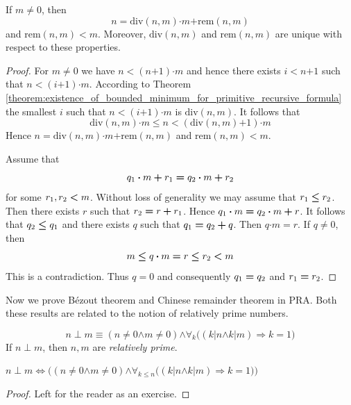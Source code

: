 \documentclass[10pt]{amsart}
\newcommand{\mforall}{\boldsymbol{\forall}}
\newcommand{\mra}{\boldsymbol{\Rightarrow}}
\newcommand{\mequiv}{\boldsymbol{\Leftrightarrow}}
\newcommand{\mand}{\boldsymbol{\wedge}}
\newcommand{\mle}{\boldsymbol{<}}
\newcommand{\mleq}{\boldsymbol{\leq}}
\newcommand{\meq}{\boldsymbol{=}}
\newcommand{\mneq}{\boldsymbol{\neq}}
\newcommand{\mplus}{\boldsymbol{+}}
\newcommand{\mdot}{\boldsymbol{\cdot}}
\begin{document}
\begin{theorem}\label{theorem:euclidean_division_theorem}
	If $m \mneq 0$, then
	$$n \meq \mathrm{div}(n,m)\mdot m \mplus \mathrm{rem}(n,m)$$
	and $\mathrm{rem}(n,m) \mle m$. Moreover, $\mathrm{div}(n,m)$ and $\mathrm{rem}(n,m)$ are unique with respect to these properties.
\end{theorem}
\begin{proof}
	For $m \mneq 0$ we have $n \mle (n \mplus 1) \mdot m$ and hence there exists $i \mle n \mplus 1$ such that $n \mle (i \mplus 1)\mdot m$. According to Theorem \ref{theorem:existence_of_bounded_minimum_for_primitive_recursive_formula} the smallest $i$ such that $n \mle (i \mplus 1)\mdot m$ is $\mathrm{div}(n,m)$. It follows that
	$$\mathrm{div}(n,m)\mdot m \mleq n \mle \left(\mathrm{div}(n,m) \mplus 1\right)\mdot m$$
	Hence $n \meq \mathrm{div}(n,m)\mdot m \mplus \mathrm{rem}(n,m)$ and $\mathrm{rem}(n,m) \mle m$.

	Assume that
	$$q_{\rm{1}}\mdot m \mplus r_{\rm{1}} \meq q_{\rm{2}}\mdot m \mplus r_{\rm{2}}$$
	for some $r_{\rm{1}},r_{\rm{2}} \mle m$. Without loss of generality we may assume that $r_{\rm{1}} \mleq r_{\rm{2}}$. Then there exists $r$ such that $r_{\rm{2}} \meq r \mplus r_{\rm{1}}$. Hence $q_{\rm{1}}\mdot m \meq q_{\rm{2}} \mdot m \mplus r$. It follows that $q_{\rm{2}} \mleq q_{\rm{1}}$ and there exists $q$ such that $q_{\rm{1}} \meq q_{\rm{2}} \mplus q$. Then $q\mdot m \meq r$. If $q \mneq 0$, then
	$$m \mleq q\mdot m \meq r \mleq r_{\rm{2}} \mle m$$
	This is a contradiction. Thus $q \meq 0$ and consequently $q_{\rm{1}} \meq q_{\rm{2}}$ and $r_{\rm{1}} \meq r_{\rm{2}}$.
\end{proof}
\noindent
Now we prove B{\'e}zout theorem and Chinese remainder theorem in $\mathrm{PRA}$. Both these results are related to the notion of relatively prime numbers.

\begin{definition}
	$$n \perp m \equiv (n\mneq 0 \mand m \mneq 0)\mand \mforall_{k}\big(\left(k|n \mand k|m\right) \mra k \meq 1\big)$$
	If $n \perp m$, then $n,m$ are \textit{relatively prime}.
\end{definition}

\begin{fact}\label{fact:relative_primeness_is_primitive_recursive}
	$n \perp m \mequiv \bigg((n\mneq 0 \mand m \mneq 0)\mand \mforall_{k \mleq n}\big((k|n \mand k|m) \mra k \meq 1\big)\bigg)$
\end{fact}
\begin{proof}
	Left for the reader as an exercise.
\end{proof}
\end{document}
